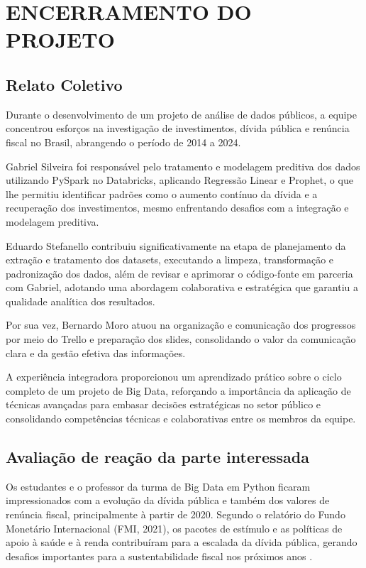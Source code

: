 \documentclass{article}
\begin{document}
\section{ENCERRAMENTO DO PROJETO}

\subsection{Relato Coletivo}

Durante o desenvolvimento de um projeto de análise de dados públicos, a equipe concentrou esforços na investigação de investimentos, dívida pública e renúncia fiscal no Brasil, abrangendo o período de 2014 a 2024.

Gabriel Silveira foi responsável pelo tratamento e modelagem preditiva dos dados utilizando PySpark no Databricks, aplicando Regressão Linear e Prophet, o que lhe permitiu identificar padrões como o aumento contínuo da dívida e a recuperação dos investimentos, mesmo enfrentando desafios com a integração e modelagem preditiva.

Eduardo Stefanello contribuiu significativamente na etapa de planejamento da extração e tratamento dos datasets, executando a limpeza, transformação e padronização dos dados, além de revisar e aprimorar o código-fonte em parceria com Gabriel, adotando uma abordagem colaborativa e estratégica que garantiu a qualidade analítica dos resultados. 

Por sua vez, Bernardo Moro atuou na organização e comunicação dos progressos por meio do Trello e preparação dos slides, consolidando o valor da comunicação clara e da gestão efetiva das informações.

A experiência integradora proporcionou um aprendizado prático sobre o ciclo completo de um projeto de Big Data, reforçando a importância da aplicação de técnicas avançadas para embasar decisões estratégicas no setor público e consolidando competências técnicas e colaborativas entre os membros da equipe.

\subsection{Avaliação de reação da parte interessada}

Os estudantes e o professor da turma de Big Data em Python ficaram impressionados com a evolução da dívida pública e também dos valores de renúncia fiscal, principalmente à partir de 2020. Segundo o relatório do Fundo Monetário Internacional (FMI, 2021), os pacotes de estímulo e as políticas de apoio à saúde e à renda contribuíram para a escalada da dívida pública, gerando desafios importantes para a sustentabilidade fiscal nos próximos anos \cite{IMF2021}.
\end{document}
